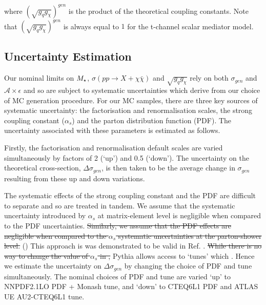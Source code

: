 where $(\sqrt{g_{q}g_{\chi}})^{gen}$ is the product of the theoretical coupling constants. Note that $(\sqrt{g_{q}g_{\chi}})^{gen}$ is always equal to $1$ for the t-channel scalar mediator model.

\subsection{Uncertainty Estimation}
Our nominal limits on $M_{\star}$, $\sigma(pp \rightarrow{X} + \chi\bar{\chi})$ and $\sqrt{g_{q}g_{\chi}}$ rely on both $\sigma_{gen}$ and $\mathcal{A}\times\epsilon$ and so are subject to systematic uncertainties which derive from our choice of MC generation procedure. For our MC samples, there are three key sources of systematic uncertainty: the factorisation and renormalisation scales, the strong coupling constant ($\alpha_{s}$) and the parton distribution function (PDF). The uncertainty associated with these parameters is estimated as follows.

%
%
Firstly, the factorisation and renormalisation default scales are varied simultaneously by factors of 2 (`up') and 0.5 (`down'). The uncertainty on the theoretical cross-section, $\Delta \sigma_{gen}$, is then taken to be the average change in $\sigma_{gen}$ resulting from these up and down variations.

The systematic effects of the strong coupling constant and the PDF are difficult to separate and so are treated in tandem. We assume that the systematic uncertainty introduced by $\alpha_{s}$ at matrix-element level is negligible when compared to the PDF uncertainties. \st{Similarly, we assume that the PDF effects are negligible when compared to the $\alpha_{s}$ systematic uncertainties at the parton-shower level.} () This approach is was demonstrated to be valid in Ref. \cite{CERN-THESIS-2015-038}. \st{While there is no way to change the value of $\alpha_{s}$ in \MG,} Pythia allows access to `tunes' which . Hence we estimate the uncertainty on $\Delta \sigma_{gen}$ by changing the choice of PDF and tune simultaneously. The nominal choices of PDF and tune are varied `up' to NNPDF2.1LO PDF + Monash tune, and `down' to CTEQ6L1 PDF and ATLAS UE AU2-CTEQ6L1 tune.

